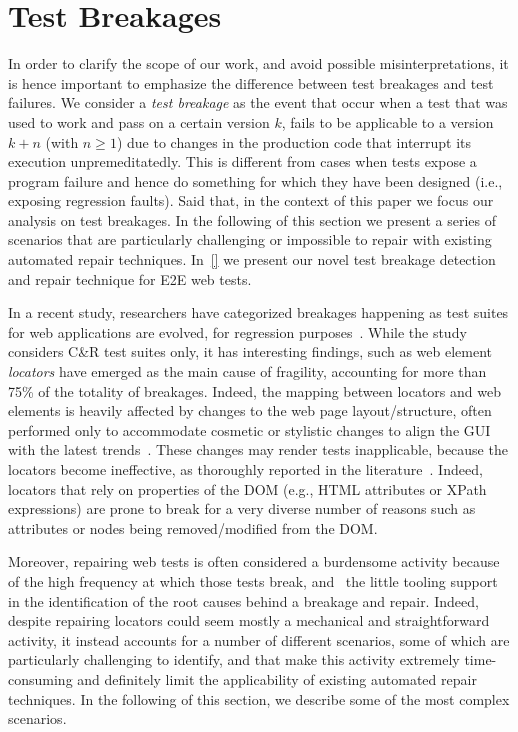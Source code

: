 \section{Test Breakages}\label{sec:breakage-scenarios}

In order to clarify the scope of our work, and avoid possible misinterpretations, it is hence important to emphasize the difference between test breakages and test failures. We consider a \textit{test breakage} as the event that occur when a test that was used to work and pass on a certain version $k$, fails to be applicable to a version $k+n$ (with $n \geq 1$) due to changes in the production code that interrupt its execution unpremeditatedly. %
This is different from cases when tests expose a program failure and hence do something for which they have been designed (i.e., exposing regression faults).
Said that, in the context of this paper we focus our analysis on test breakages. In the following of this section we present a series of scenarios that are particularly challenging or impossible to repair with existing automated repair techniques. In~\autoref{} we present our novel test breakage detection and repair technique for E2E web tests.

In a recent study, researchers have categorized breakages happening as test suites for web applications are evolved, for regression purposes~\cite{Hammoudi-2016-ICST}. While the study considers C\&R test suites only, it has interesting findings, such as web element \textit{locators} have emerged as the main cause of fragility, accounting for more than 75\% of the totality of breakages.  
%
Indeed, the mapping between locators and web elements is heavily affected by changes to the web page layout/structure, often performed only to accommodate cosmetic or stylistic changes to align the GUI with the latest trends~\cite{2016-leotta-Advances,2016-Leotta-JSEP}. These changes may render tests inapplicable, because the locators become ineffective, as thoroughly reported in the literature~\cite{2016-leotta-Advances,2016-Leotta-JSEP,Choudhary:2011:WWA:2002931.2002935,Hammoudi-2016-ICST}. 
Indeed, locators that rely on properties of the DOM (e.g., HTML attributes or XPath expressions) are prone to break for a very diverse number of reasons such as attributes or nodes being removed/modified from the DOM.

Moreover, repairing web tests is often considered a burdensome activity because of the high frequency at which those tests break, and ~the little tooling support in the identification of the root causes behind a breakage and repair.
%
Indeed, despite repairing locators could seem mostly a mechanical and straightforward activity, it instead accounts for a number of different scenarios, some of which are particularly challenging to identify, and that make this activity extremely time-consuming and 
definitely limit the applicability of existing automated repair techniques. In the following of this section, we describe some of the most complex scenarios.


